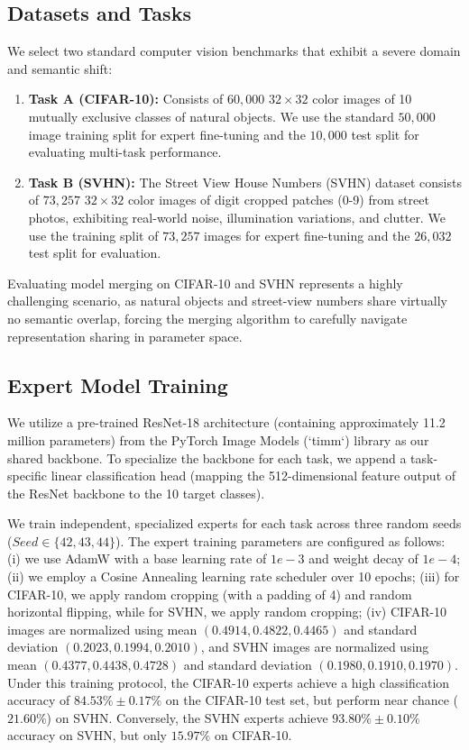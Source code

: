 \documentclass{article}
\theoremstyle{plain}
\theoremstyle{definition}
\theoremstyle{remark}
\begin{document}
\subsection{Datasets and Tasks}
We select two standard computer vision benchmarks that exhibit a severe domain and semantic shift:
\begin{enumerate}
    \item \textbf{Task A (CIFAR-10):} Consists of $60,000$ $32\times32$ color images of 10 mutually exclusive classes of natural objects. We use the standard $50,000$ image training split for expert fine-tuning and the $10,000$ test split for evaluating multi-task performance.
    \item \textbf{Task B (SVHN):} The Street View House Numbers (SVHN) dataset consists of $73,257$ $32\times32$ color images of digit cropped patches (0-9) from street photos, exhibiting real-world noise, illumination variations, and clutter. We use the training split of $73,257$ images for expert fine-tuning and the $26,032$ test split for evaluation.
\end{enumerate}
Evaluating model merging on CIFAR-10 and SVHN represents a highly challenging scenario, as natural objects and street-view numbers share virtually no semantic overlap, forcing the merging algorithm to carefully navigate representation sharing in parameter space.

\subsection{Expert Model Training}
We utilize a pre-trained ResNet-18 architecture (containing approximately 11.2 million parameters) from the PyTorch Image Models (`timm`) library as our shared backbone. To specialize the backbone for each task, we append a task-specific linear classification head (mapping the 512-dimensional feature output of the ResNet backbone to the 10 target classes).

We train independent, specialized experts for each task across three random seeds ($Seed \in \{42, 43, 44\}$). The expert training parameters are configured as follows: (i) we use AdamW with a base learning rate of $1e-3$ and weight decay of $1e-4$; (ii) we employ a Cosine Annealing learning rate scheduler over 10 epochs; (iii) for CIFAR-10, we apply random cropping (with a padding of 4) and random horizontal flipping, while for SVHN, we apply random cropping; (iv) CIFAR-10 images are normalized using mean $(0.4914, 0.4822, 0.4465)$ and standard deviation $(0.2023, 0.1994, 0.2010)$, and SVHN images are normalized using mean $(0.4377, 0.4438, 0.4728)$ and standard deviation $(0.1980, 0.1910, 0.1970)$.
Under this training protocol, the CIFAR-10 experts achieve a high classification accuracy of $84.53\% \pm 0.17\%$ on the CIFAR-10 test set, but perform near chance ($21.60\%$) on SVHN. Conversely, the SVHN experts achieve $93.80\% \pm 0.10\%$ accuracy on SVHN, but only $15.97\%$ on CIFAR-10.
\end{document}
